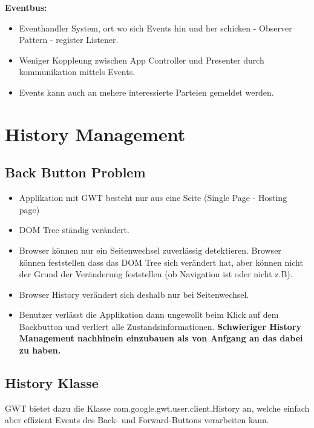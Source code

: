 \documentclass[a4paper,10pt]{scrreprt}
\begin{document}
\textbf{Eventbus:}
\begin{itemize}
 \item Eventhandler System, ort wo sich Events hin und her schicken - Observer Pattern - register Listener.
 \item Weniger Koppleung zwischen App Controller und Presenter durch kommunikation mittels Events.
 \item Events kann auch an mehere interessierte Parteien gemeldet werden.
\end{itemize}

\chapter{History Management}

\section{Back Button Problem}
\begin{itemize}
 \item  Applikation mit GWT besteht nur aus eine Seite (Single Page - Hosting page)
 \item DOM Tree ständig verändert.
 \item Browser können nur ein Seitenwechsel zuverlässig detektieren. Browser können feststellen dass das DOM Tree sich 
verändert hat, aber können nicht der Grund der Veränderung feststellen (ob Navigation ist oder nicht z.B).
\item Browser History verändert sich deshalb nur bei Seitenwechsel.
\item Benutzer verlässt die Applikation dann ungewollt beim Klick auf dem Backbutton und verliert alle 
Zustandsinformationen. \textbf{Schwieriger History Management nachhinein einzubauen als von Anfgang an das dabei zu 
haben.}
\end{itemize}

\section{History Klasse}
GWT bietet dazu die Klasse com.google.gwt.user.client.History an, welche einfach
aber effizient Events des Back- und Forward-Buttons verarbeiten kann.
\end{document}
